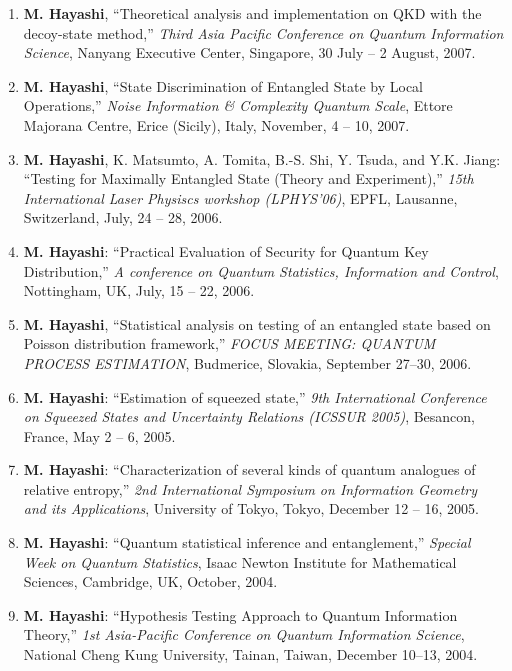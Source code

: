 \documentclass[a4paper,12pt,oneside]{article}
\begin{document}
\begin{enumerate}
\item
\textbf{M. Hayashi}, ``Theoretical analysis and implementation on QKD with the decoy-state method,'' 
{\em Third Asia Pacific Conference on Quantum Information Science}, 
Nanyang Executive Center, Singapore, 
30 July -- 2 August, 2007.

\item
\textbf{M. Hayashi}, ``State Discrimination of Entangled State by Local Operations,'' 
{\em Noise Information \& Complexity \@ Quantum Scale}, Ettore Majorana Centre, Erice (Sicily), Italy, November, 4 -- 10, 2007.


\item
\textbf{M. Hayashi}, K. Matsumto, A. Tomita, B.-S. Shi, Y. Tsuda, and Y.K. Jiang: ``Testing for Maximally Entangled State (Theory and Experiment),'' 
{\em 15th International Laser Physiscs workshop (LPHYS'06)}, EPFL, Lausanne, Switzerland, 
July, 24 -- 28, 2006.

\item
\textbf{M. Hayashi}: ``Practical Evaluation of Security for Quantum Key Distribution,'' 
{\em A conference on Quantum Statistics, Information and Control}, Nottingham, UK, July, 15 -- 22, 2006.

\item
\textbf{M. Hayashi}, ``Statistical analysis on testing of an entangled state based on Poisson distribution framework,'' 
{\em FOCUS MEETING: QUANTUM PROCESS ESTIMATION}, 
Budmerice, Slovakia, September 27--30, 2006.

\item
\textbf{M. Hayashi}: ``Estimation of squeezed state,'' 
{\em 9th International Conference on Squeezed States and Uncertainty Relations (ICSSUR 2005)}, Besancon, France, May 2 -- 6,  2005.

\item
\textbf{M. Hayashi}: ``Characterization of several kinds of quantum analogues of relative entropy,'' 
{\em 2nd International Symposium on Information Geometry and its Applications}, 
University of Tokyo, Tokyo, December 12 -- 16,  2005.

\item
\textbf{M. Hayashi}: ``Quantum statistical inference and entanglement,'' 
{\em Special Week on Quantum Statistics}, Isaac Newton Institute for Mathematical Sciences, Cambridge, UK, October, 2004.

\item
\textbf{M. Hayashi}: ``Hypothesis Testing Approach to Quantum Information Theory,'' 
{\em 1st Asia-Pacific Conference on Quantum Information Science}, 
National Cheng Kung University, Tainan, Taiwan,
December 10--13, 2004.



\end{enumerate}
\end{document}
